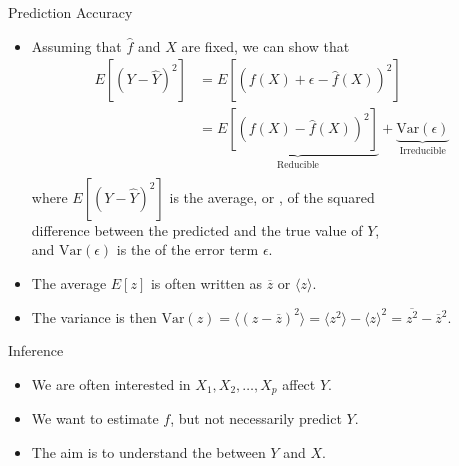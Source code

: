 \documentclass[mathserif, aspectratio=169]{beamer}
\begin{document}
\begin{frame}{Prediction Accuracy}
	\begin{itemize}
		\item Assuming that $\hat{f}$ and $X$ are fixed, we can show that
			\begin{align*}
				E[(Y - \hat{Y})^2] &= E[(f(X) + \epsilon - \hat{f}(X))^2]\\ 
				&= \underbrace{E[(f(X) - \hat{f}(X))^2]}_\text{Reducible}
				+ \underbrace{\text{Var}(\epsilon)}_\text{Irreducible} \\ 
			\end{align*}
			where $E[(Y - \hat{Y})^2]$ is the average, or , of the squared\\
			difference between the predicted and the true value of $Y$,\\
			and $\text{Var}(\epsilon)$ is the  of the error term $\epsilon$.
		\item The average $E[z]$ is often written as $\overline{z}$ or $\langle z \rangle$.
		\item The variance is then $\text{Var}(z) = \langle (z - \overline{z})^2 \rangle
			= \langle z^2 \rangle - {\langle z \rangle}^2 = \overline{z^2} - \overline{z}^2$.
	\end{itemize}
\end{frame}

\begin{frame}{Inference}
	\begin{itemize}
		\item We are often interested in  $X_1, X_2, \dots, X_p$ affect $Y$.
		\item We want to estimate $f$, but not necessarily predict $Y$.
		\item The aim is to understand the  between $Y$ and $X$.
	\end{itemize}
\end{frame}
\end{document}
